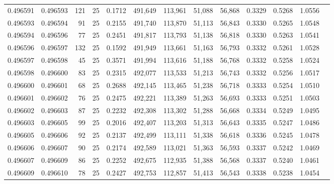 \begin{tabular}{rrrrrrrrrrrrr}
0.496591 & 0.496593 &   121 &  25 &                                     0.1712 & 491,649 & 113,961 &  51,088 &  56,868 & 0.3329 & 0.5268 & 1.0556 \\
0.496593 & 0.496594 &    91 &  25 &                                     0.2155 & 491,740 & 113,870 &  51,113 &  56,843 & 0.3330 & 0.5265 & 1.0548 \\
0.496594 & 0.496596 &    77 &  25 &                                     0.2451 & 491,817 & 113,793 &  51,138 &  56,818 & 0.3330 & 0.5263 & 1.0541 \\
0.496596 & 0.496597 &   132 &  25 &                                     0.1592 & 491,949 & 113,661 &  51,163 &  56,793 & 0.3332 & 0.5261 & 1.0528 \\
0.496597 & 0.496598 &    45 &  25 &                                     0.3571 & 491,994 & 113,616 &  51,188 &  56,768 & 0.3332 & 0.5258 & 1.0524 \\
0.496598 & 0.496600 &    83 &  25 &                                     0.2315 & 492,077 & 113,533 &  51,213 &  56,743 & 0.3332 & 0.5256 & 1.0517 \\
0.496600 & 0.496601 &    68 &  25 &                                     0.2688 & 492,145 & 113,465 &  51,238 &  56,718 & 0.3333 & 0.5254 & 1.0510 \\
0.496601 & 0.496602 &    76 &  25 &                                     0.2475 & 492,221 & 113,389 &  51,263 &  56,693 & 0.3333 & 0.5251 & 1.0503 \\
0.496602 & 0.496603 &    87 &  25 &                                     0.2232 & 492,308 & 113,302 &  51,288 &  56,668 & 0.3334 & 0.5249 & 1.0495 \\
0.496603 & 0.496605 &    99 &  25 &                                     0.2016 & 492,407 & 113,203 &  51,313 &  56,643 & 0.3335 & 0.5247 & 1.0486 \\
0.496605 & 0.496606 &    92 &  25 &                                     0.2137 & 492,499 & 113,111 &  51,338 &  56,618 & 0.3336 & 0.5245 & 1.0478 \\
0.496606 & 0.496607 &    90 &  25 &                                     0.2174 & 492,589 & 113,021 &  51,363 &  56,593 & 0.3337 & 0.5242 & 1.0469 \\
0.496607 & 0.496609 &    86 &  25 &                                     0.2252 & 492,675 & 112,935 &  51,388 &  56,568 & 0.3337 & 0.5240 & 1.0461 \\
0.496609 & 0.496610 &    78 &  25 &                                     0.2427 & 492,753 & 112,857 &  51,413 &  56,543 & 0.3338 & 0.5238 & 1.0454 \\

\end{tabular}
